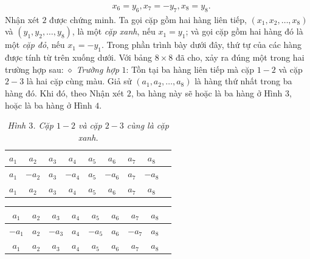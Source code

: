 \begin{multicols}{2}
\begin{align*}
		&x_6 = y_6, x_7 = -y_7, x_8 = y_8.
	\end{align*}
	Nhận xét $2$ được chứng minh.
	\vskip 0.05cm
	Ta gọi cặp gồm hai hàng liên tiếp,  $\left( {{x_1},{x_2}, \ldots ,{x_8}} \right)$ và  $\left( {{y_1},{y_2}, \ldots ,{y_8}} \right)$, là một \textit{cặp xanh}, nếu  $x_1 = y_1$; và gọi cặp gồm hai hàng đó là một \textit{cặp đỏ}, nếu  $x_1 = -y_1$.
	\vskip 0.05cm
	Trong phần trình bày dưới đây, thứ tự của các hàng được tính từ trên xuống dưới.
	\vskip 0.05cm
	Với bảng $8 \times  8$ đã cho, xảy ra đúng một trong hai trường hợp sau:
	\vskip 0.05cm
	$\diamond$ \textit{Trường hợp} $1$: Tồn tại ba hàng liên tiếp mà cặp $1 - 2$ và cặp $2 - 3$ là hai cặp cùng màu.
	\vskip 0.05cm
	Giả sử $\left( {{a_1},{a_2}, \ldots ,{a_8}} \right)$  là hàng thứ nhất trong ba hàng đó. Khi đó, theo Nhận xét $2$, ba hàng này sẽ hoặc là ba hàng ở Hình $3$, hoặc là ba hàng ở Hình $4$.
	\begin{table}[H]
		\vspace*{-5pt}
		\centering
		\captionsetup{labelformat= empty, justification=centering}
		\renewcommand{\arraystretch}{1.2}
		\setlength{\tabcolsep}{4.5pt}
		\begin{tabular}{|c|c|c|c|c|c|c|c|c|}
			\hline
			$a_1$ & $a_2$ & $a_3$ & $a_4$ & $a_5$ & $a_6$ & $a_7$ & $a_8$ \\
			\hline
			$a_1$ & $-a_2$ & $a_3$ & $-a_4$ & $a_5$ & $-a_6$ & $a_7$ & $-a_8$ \\
			\hline
			$a_1$ & $a_2$ & $a_3$ & $a_4$ & $a_5$ & $a_6$ & $a_7$ & $a_8$ \\
			\hline
		\end{tabular}
		\caption{\small\textit{\color{thachthuctoanhoc}Hình $3$. Cặp $1 - 2$ và cặp $2 - 3$ cùng là cặp xanh.}}
		\vspace*{-10pt}
	\end{table}
	\begin{table}[H]
		\vspace*{-5pt}
		\centering
		\captionsetup{labelformat= empty, justification=centering}
		\renewcommand{\arraystretch}{1.2}
		\setlength{\tabcolsep}{4.5pt}
		\begin{tabular}{|c|c|c|c|c|c|c|c|c|}
			\hline
			$a_1$ & $a_2$ & $a_3$ & $a_4$ & $a_5$ & $a_6$ & $a_7$ & $a_8$ \\
			\hline
			$-a_1$ & $a_2$ & $-a_3$ & $a_4$ & $-a_5$ & $a_6$ & $-a_7$ & $a_8$ \\
			\hline
			$a_1$ & $a_2$ & $a_3$ & $a_4$ & $a_5$ & $a_6$ & $a_7$ & $a_8$ \\
			\hline
		\end{tabular}

\end{table}
\end{multicols}
